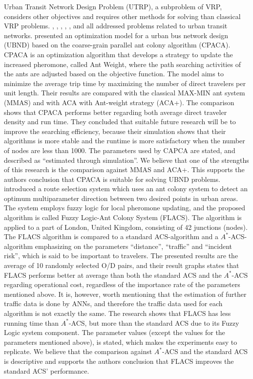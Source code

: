 Urban Transit Network Design Problem (UTRP), a subproblem of VRP, considers other objectives and requires other methods for solving than classical VRP problems. \citet{yang07}, \citet{salehinejad10}, \citet{jiang10}, \citet{poorzahedy11}, \citet{nikolic14}, and \citet{kechagiopoulos14} all addressed problems related to urban transit networks. 
\citet{yang07} presented an optimization model for a urban bus network design (UBND) based on the coarse-grain parallel ant colony algorithm (CPACA). CPACA is an optimization algorithm that develops a strategy to update the increased pheromone, called Ant Weight, where the path searching activities of the ants are adjusted based on the objective function. The model aims to minimize the average trip time by maximizing the number of direct travelers per unit length. Their results are compared with the classical MAX-MIN ant system (MMAS)\citep{stutzle99} and with ACA with Ant-weight strategy (ACA+). The comparison shows that CPACA performs better regarding both average direct traveler density and run time. They concluded that suitable future research will be to improve the searching efficiency, because their simulation shows that their algorithms is more stable and the runtime is more satisfactory when the number of nodes are less than 1000. The parameters used by CAPCA are stated, and described as ``estimated through simulation''. We believe that one of the strengths of this research is the comparison against MMAS and ACA+. This supports the authors conclusion that CPACA is suitable for solving UBND problems.   
\citet{salehinejad10} introduced a route selection system which uses an ant colony system to detect an optimum multiparameter direction between two desired points in urban areas. The system employs fuzzy logic for local pheromone updating, and the proposed algorithm is called Fuzzy Logic-Ant Colony System (FLACS). The algorithm is applied to a part of London, United Kingdom, consisting of 42 junctions (nodes). The FLACS algorithm is compared to a standard ACS-algorithm and a $A^*$-ACS-algorithm emphasizing on the parameters ``distance'', ``traffic'' and ``incident risk'', which is said to be important to travelers. The presented results are the average of 10 randomly selected O/D pairs, and their result graphs states that FLACS performs better at average than both the standard ACS and the $A^*$-ACS regarding operational cost, regardless of the importance rate of the parameters mentioned above. It is, however, worth mentioning that the estimation of further traffic data is done by ANNs, and therefore the traffic data used for each algorithm is not exactly the same. The research shows that FLACS has less running time than $A^*$-ACS, but more than the standard ACS due to its Fuzzy Logic system component. The parameter values (except the values for the parameters mentioned above), is stated, which makes the experiments easy to replicate. We believe that the comparison against $A^*$-ACS and the standard ACS is descriptive and supports the authors conclusion that FLACS improves the standard ACS' performance. 

